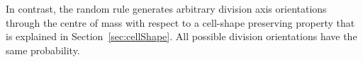 \documentclass[11pt,a4paper, final]{article}
\begin{document}


In contrast, the random rule generates arbitrary division axis orientations through the centre of mass with respect to a cell-shape preserving property that is explained in Section~\ref{sec:cellShape}. All possible division orientations have the same probability.

\end{document}
